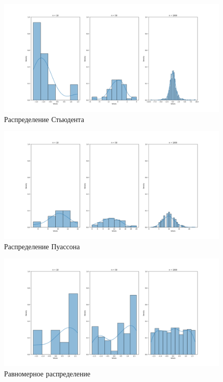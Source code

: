 \documentclass[12pt,a4paper]{article}
\begin{document}
	\newpage

	\begin{figure}[h!]
		\begin{center}
			\includegraphics[width = 1.12\linewidth]{graphics/student.png}
			\caption{Распределение Стьюдента}
		\end{center}
	\end{figure}

	\begin{figure}[h!]
		\begin{center}
			\includegraphics[width = 1.12\linewidth]{graphics/poisson.png}
			\caption{Распределение Пуассона}
		\end{center}
	\end{figure}

	\begin{figure}[h!]
		\begin{center}
			\includegraphics[width = 1.12\linewidth]{graphics/uniform.png}
			\caption{Равномерное распределение}
		\end{center}
	\end{figure}
\end{document}
